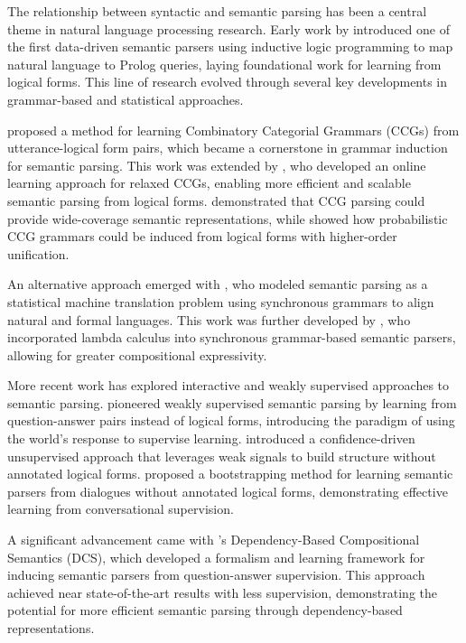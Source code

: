 The relationship between syntactic and semantic parsing has been a central theme in natural language processing research. Early work by \citet{zelle1996} introduced one of the first data-driven semantic parsers using inductive logic programming to map natural language to Prolog queries, laying foundational work for learning from logical forms. This line of research evolved through several key developments in grammar-based and statistical approaches.

\citet{zettlemoyer2005} proposed a method for learning Combinatory Categorial Grammars (CCGs) from utterance-logical form pairs, which became a cornerstone in grammar induction for semantic parsing. This work was extended by \citet{zettlemoyer2007online}, who developed an online learning approach for relaxed CCGs, enabling more efficient and scalable semantic parsing from logical forms. \citet{bos2004} demonstrated that CCG parsing could provide wide-coverage semantic representations, while \citet{kwiatkowski2010} showed how probabilistic CCG grammars could be induced from logical forms with higher-order unification.

An alternative approach emerged with \citet{wong2006learning}, who modeled semantic parsing as a statistical machine translation problem using synchronous grammars to align natural and formal languages. This work was further developed by \citet{wong2007}, who incorporated lambda calculus into synchronous grammar-based semantic parsers, allowing for greater compositional expressivity.

More recent work has explored interactive and weakly supervised approaches to semantic parsing. \citet{clarke2010} pioneered weakly supervised semantic parsing by learning from question-answer pairs instead of logical forms, introducing the paradigm of using the world's response to supervise learning. \citet{goldwasser2011confidence} introduced a confidence-driven unsupervised approach that leverages weak signals to build structure without annotated logical forms. \citet{artzi2011} proposed a bootstrapping method for learning semantic parsers from dialogues without annotated logical forms, demonstrating effective learning from conversational supervision.

A significant advancement came with \citet{liang2013learning}'s Dependency-Based Compositional Semantics (DCS), which developed a formalism and learning framework for inducing semantic parsers from question-answer supervision. This approach achieved near state-of-the-art results with less supervision, demonstrating the potential for more efficient semantic parsing through dependency-based representations.

